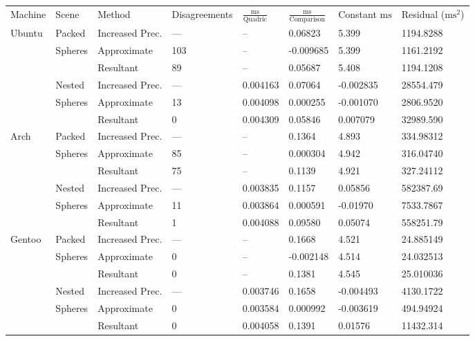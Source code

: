 \begin{tabular}{|l|l|ll|lll|l|}
\hline
Machine & Scene & Method & Disagreements & $\frac{\text{ms}}{\text{Quadric}}$ & $\frac{\text{ms}}{\text{Comparison}}$ & Constant $\text{ms}$ & Residual ($\text{ms}^2$)\\
\hhline{|=|=|==|===|=|}
Ubuntu & Packed & Increased Prec. & --- & -- & \hphantom{-}0.06823 & \hphantom{-}5.399 & 1194.8288\\
& Spheres & Approximate & 103 & -- & -0.009685 & \hphantom{-}5.399 & 1161.2192\\
&& Resultant & \hphantom{1}89 & -- & \hphantom{-}0.05687 & \hphantom{-}5.408 & 1194.1208\\
\hline
& Nested & Increased Prec. & --- & 0.004163 & \hphantom{-}0.07064 & -0.002835 & 28554.479\\
& Spheres & Approximate & \hphantom{1}13 & 0.004098 & \hphantom{-}0.000255 & -0.001070 & \hphantom{2}2806.9520\\
&& Resultant & \hphantom{10}0 & 0.004309 & \hphantom{-}0.05846 & \hphantom{-}0.007079 & 32989.590\\
\hline
Arch & Packed & Increased Prec. & --- & -- & \hphantom{-}0.1364 & \hphantom{-}4.893 & 334.98312\\
& Spheres & Approximate & \hphantom{1}85 & -- & \hphantom{-}0.000304 & \hphantom{-}4.942 & 316.04740\\
&& Resultant & \hphantom{1}75 & -- & \hphantom{-}0.1139 & \hphantom{-}4.921 & 327.24112\\
\hline
& Nested & Increased Prec. & --- & 0.003835 & \hphantom{-}0.1157 & \hphantom{-}0.05856 & 582387.69\\
& Spheres & Approximate & \hphantom{1}11 & 0.003864 & \hphantom{-}0.000591 & -0.01970 & 7533.7867\\
&& Resultant & \hphantom{10}1 & 0.004088 & \hphantom{-}0.09580 & \hphantom{-}0.05074 & 558251.79\\
\hline
Gentoo & Packed & Increased Prec. & --- & -- & \hphantom{-}0.1668 & \hphantom{-}4.521 & 24.885149\\
& Spheres & Approximate & \hphantom{10}0 & -- & -0.002148 & \hphantom{-}4.514 & 24.032513\\
&& Resultant & \hphantom{10}0 & -- & \hphantom{-}0.1381 & \hphantom{-}4.545 & 25.010036\\
\hline
& Nested & Increased Prec. & --- & 0.003746 & \hphantom{-}0.1658 & -0.004493 & 4130.1722\\
& Spheres & Approximate & \hphantom{10}0 & 0.003584 & \hphantom{-}0.000992 & -0.003619 & \hphantom{4}494.94924\\
&& Resultant & \hphantom{10}0 & 0.004058 & \hphantom{-}0.1391 & \hphantom{-}0.01576 & 11432.314\\
\hline
\end{tabular}
